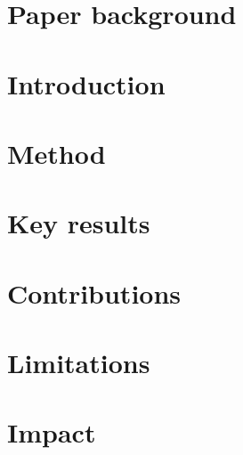 \documentclass[11pt,a4paper,oneside]{report}
\begin{document}
\section*{Paper background}

\section*{Introduction}

\section*{Method}

\section*{Key results}

\section*{Contributions}

\section*{Limitations}

\section*{Impact}
\end{document}
